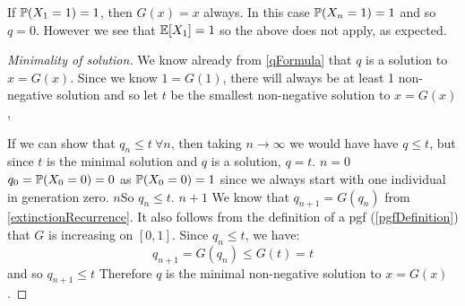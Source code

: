 \documentclass[../main.tex]{subfiles}
\begin{document}
\begin{remark}
  If $\P(X_1 = 1) = 1$, then $G(x) = x$ always.
  In this case $\P(X_n = 1) = 1$ and so $q = 0$.
  However we see that $\E[X_1] = 1$ so the above does not apply, as expected.
\end{remark}
\begin{proof}[Minimality of solution]
  We know already from \cref{qFormula} that $q$ is a solution to $x = G(x)$.
  Since we know $1 = G(1)$, there will always be at least 1 non-negative solution and so let $t$ be the smallest non-negative solution to $x = G(x)$,

  If we can show that $q_n \leq t\ \forall n$, then taking $n \to \infty$ we would have have $q \leq t$, but since $t$ is the minimal solution and $q$ is a solution, $q = t$.
  \quietinduction
  {$n = 0$}{
    $q_0 = \P(X_0 = 0) = 0$ as $\P(X_0 = 0) = 1$ since we always start with one individual in generation zero.
  }
  {$n$}{So $q_n \leq t$.}
  {$n + 1$}{
    We know that $q_{n + 1} = G(q_n)$ from \cref{extinctionRecurrence}.
    It also follows from the definition of a pgf (\cref{pgfDefinition}) that $G$ is increasing on $[0, 1]$.
    Since $q_n \leq t$, we have:
    \[
      q_{n + 1} = G(q_{n}) \leq G(t) = t
    \]
    and so $q_{n + 1} \leq t$
  }
  Therefore $q$ is the minimal non-negative solution to $x = G(x)$.
\end{proof}
\end{document}
